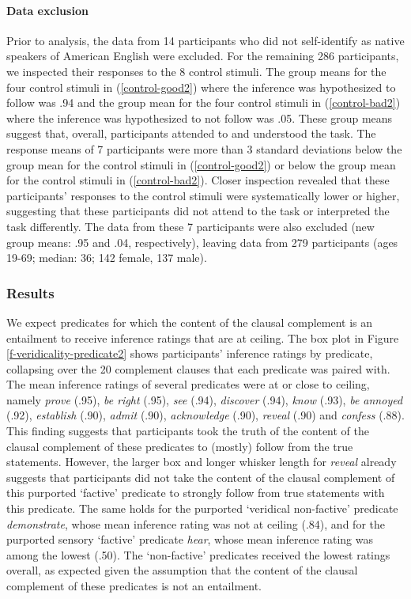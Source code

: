 \documentclass[11pt,fleqn]{article}
\newcommand{\6}{\mbox{$[\hspace*{-.6mm}[$}}
\newcommand{\9}{\mbox{$]\hspace*{-.6mm}]$}}
\begin{document}
\paragraph{Data exclusion}
Prior to analysis, the data from 14 participants who did not self-identify as native speakers of American English were excluded. For the remaining 286 participants, we inspected their responses to the 8 control stimuli. The group means for the four control stimuli in (\ref{control-good2}) where the inference was hypothesized to follow was .94 and the group mean for the four control stimuli in (\ref{control-bad2}) where the inference was hypothesized to not follow was .05. These group means suggest that, overall, participants attended to and understood the task. The response means of 7 participants were more than 3 standard deviations below the group mean for the control stimuli in (\ref{control-good2}) or below the group mean for the control stimuli in (\ref{control-bad2}). Closer inspection revealed that these participants' responses to the control stimuli were systematically lower or higher, suggesting that these participants did not attend to the task or interpreted the task differently. The data from these 7 participants were also excluded (new group means: .95 and .04, respectively), leaving data from 279 participants (ages 19-69; median: 36; 142 female, 137 male).

\subsubsection{Results}

We expect predicates for which the content of the clausal complement is an entailment to receive inference ratings that are at ceiling. The box plot in Figure \ref{f-veridicality-predicate2} shows participants' inference ratings by predicate, collapsing over the 20 complement clauses that each predicate was paired with. The mean inference ratings of several predicates were at or close to ceiling, namely {\em prove} (.95), {\em be right} (.95), {\em see} (.94), {\em discover} (.94), {\em know} (.93), {\em be annoyed} (.92), {\em establish} (.90), {\em admit} (.90), {\em acknowledge} (.90), {\em reveal} (.90) and {\em confess} (.88). This finding suggests that participants took the truth of the content of the clausal complement of these predicates to (mostly) follow from the true statements. However, the larger box and longer whisker length for {\em reveal} already suggests that participants did not take the content of the clausal complement of this purported `factive' predicate to strongly follow from true statements with this predicate. The same holds for the purported `veridical non-factive' predicate {\em demonstrate}, whose mean inference rating was not at ceiling (.84), and for the purported sensory `factive' predicate {\em hear}, whose mean inference rating was among the lowest (.50). The `non-factive' predicates received the lowest ratings overall, as expected given the assumption that the content of the clausal complement of these predicates is not an entailment.
\end{document}
